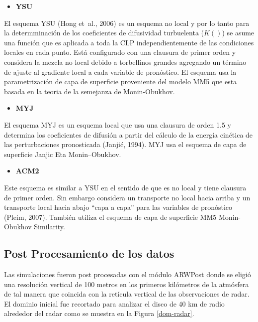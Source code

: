 \documentclass[12pt,spanish,oneside, a4paper]{book}
\providecommand{\tightlist}{%
  \setlength{\itemsep}{0pt}\setlength{\parskip}{0pt}}
\begin{document}
\begin{itemize}
\tightlist
\item
  \textbf{YSU}
\end{itemize}

El esquema YSU (Hong et~al., 2006) es un esquema no local y por lo tanto
para la determminación de los coeficientes de difusividad turbuelenta
(\(K()\)) se asume una función que es aplicada a toda la CLP
independientemente de las condiciones locales en cada punto. Está
configurado con una clausura de primer orden y considera la mezcla no
local debido a torbellinos grandes agregando un término de ajuste al
gradiente local a cada variable de pronóstico. El esquema usa la
parametrización de capa de superficie proveniente del modelo MM5 que
esta basada en la teoria de la semejanza de Monin-Obukhov.

\begin{itemize}
\tightlist
\item
  \textbf{MYJ}
\end{itemize}

El esquema MYJ es un esquema local que usa una clausura de orden 1.5 y
determina los coeficientes de difusión a partir del cálculo de la
energía cinética de las perturbaciones pronosticada (Janjić, 1994). MYJ
usa el esquema de capa de superficie Janjic Eta Monin--Obukhov.

\begin{itemize}
\tightlist
\item
  \textbf{ACM2}
\end{itemize}

Este esquema es similar a YSU en el sentido de que es no local y tiene
clausura de primer orden. Sin embargo considera un transporte no local
hacia arriba y un transporte local hacia abajo ``capa a capa'' para las
variables de pronóstico (Pleim, 2007). También utiliza el esquema de
capa de superficie MM5 Monin-Obukhov Similarity.

\subsection{Post Procesamiento de los
datos}\label{post-procesamiento-de-los-datos}

Las simulaciones fueron post procesadas con el módulo ARWPost donde se
eligió una resolución vertical de 100 metros en los primeros kilómetros
de la atmósfera de tal manera que coincida con la retícula vertical de
las observaciones de radar. El dominio inicial fue recortado para
analizar el disco de 40 km de radio alrededor del radar como se muestra
en la Figura \ref{dom-radar}.
\end{document}
